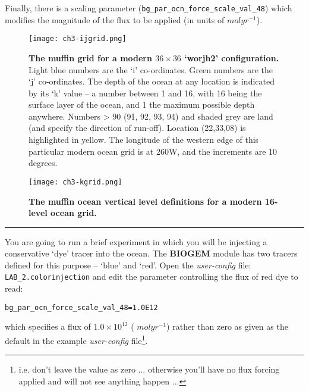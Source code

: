 \documentclass[11pt,fleqn]{book} %
\begin{document}
Finally, there is a scaling parameter (\texttt{bg\_par\_ocn\_force\_scale\_val\_48}) which modifies the magnitude of the flux to be applied (in units of \(mol yr^{-1}\)).

\begin{figure}
\texttt{[image: ch3-ijgrid.png]}\centering
\vspace{-0mm}
\caption{
\textbf{The  muffin grid for a modern \(36\times36\) ‘worjh2’ configuration.} Light blue numbers are the ‘i’ co-ordinates. Green numbers are the ‘j’ co-ordinates.
The depth of the ocean at any location is indicated by its ‘k’ value – a number between 1 and 16, with 16 being the surface layer of the ocean, and 1 the maximum possible depth anywhere.
Numbers > 90 (91, 92, 93, 94) and shaded grey are land (and specify the direction of run-off).
Location (22,33,08) is highlighted in yellow.
The longitude of the western edge of this particular modern ocean grid is at 260W, and the increments are 10 degrees. 
}
\label{fig:ch3-ijgrid}
\end{figure}

\begin{figure}
\texttt{[image: ch3-kgrid.png]}\centering
\vspace{-0mm}
\caption{\textbf{The muffin ocean vertical level definitions for a modern 16-level ocean grid.}}
\label{fig:ch3-kgrid}
\end{figure}

\hfill \break
\noindent\rule{4cm}{0.1mm}
\hfill \break

\noindent You are going to run a brief experiment in which you will be injecting a conservative ‘dye’ tracer into the ocean. The \textbf{BIOGEM} module has two tracers defined for this purpose – ‘blue’ and ‘red’. Open the \textit{user-config} file: \texttt{LAB\_2.colorinjection} and edit the parameter controlling the flux of red dye to read:

\vspace{-2mm}
\begin{verbatim}
bg_par_ocn_force_scale_val_48=1.0E12
\end{verbatim}
\vspace{-2mm}

\noindent which specifies a flux of \(1.0\times10^{12}\) ( \(mol yr^{-1}\)) rather than zero as given as the default in the example \textit{user-config} file\footnote{i.e. don't leave the value as zero ... otherwise you'll have no flux forcing applied and will not see anything happen ...}.
\end{document}
